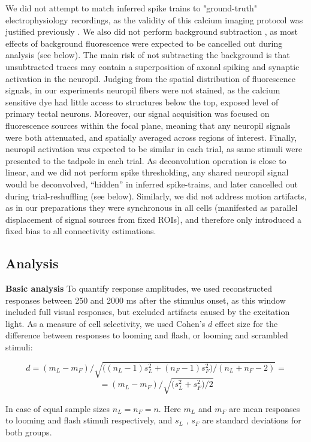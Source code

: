 \documentclass{article}
\begin{document}
We did not attempt to match inferred spike trains to "ground-truth" electrophysiology recordings, as the validity of this calcium imaging protocol was justified previously \citep{xu2011, truszkowski2017}. We also did not perform background subtraction \citep{truszkowski2017}, as most effects of background fluorescence were expected to be cancelled out during analysis (see below). The main risk of not subtracting the background is that unsubtracted traces may contain a superposition of axonal spiking and synaptic activation in the neuropil. Judging from the spatial distribution of fluorescence signals, in our experiments neuropil fibers were not stained, as the calcium sensitive dye had little access to structures below the top, exposed level of primary tectal neurons. Moreover, our signal acquisition was focused on fluorescence sources within the focal plane, meaning that any neuropil signals were both attenuated, and spatially averaged across regions of interest. Finally, neuropil activation was expected to be similar in each trial, as same stimuli were presented to the tadpole in each trial. As deconvolution operation is close to linear, and we did not perform spike thresholding, any shared neuropil signal would be deconvolved, “hidden” in inferred spike-trains, and later cancelled out during trial-reshuffling (see below). Similarly, we did not address motion artifacts, as in our preparations they were synchronous in all cells (manifested as parallel displacement of signal sources from fixed ROIs), and therefore only introduced a fixed bias to all connectivity estimations.

\subsection*{Analysis}

\textbf{Basic analysis} To quantify response amplitudes, we used reconstructed responses between 250 and 2000 ms after the stimulus onset, as this window included full visual responses, but excluded artifacts caused by the excitation light. As a measure of cell selectivity, we used Cohen’s $d$ effect size for the difference between responses to looming and flash, or looming and scrambled stimuli:

\[ d = (m_L-m_F)/ \sqrt{ \big((n_L-1) s^2_L + (n_F-1) s^2_F)/(n_L + n_F - 2)} = \]
\[ =(m_L-m_F)/\sqrt{\big(s^2_L+s^2_F\big)/2} \]

In case of equal sample sizes $n_L=n_F=n$. Here $m_L$ and $m_F$ are mean responses to looming and flash stimuli respectively, and $s_L$ , $s_F$ are standard deviations for both groups.
\end{document}

